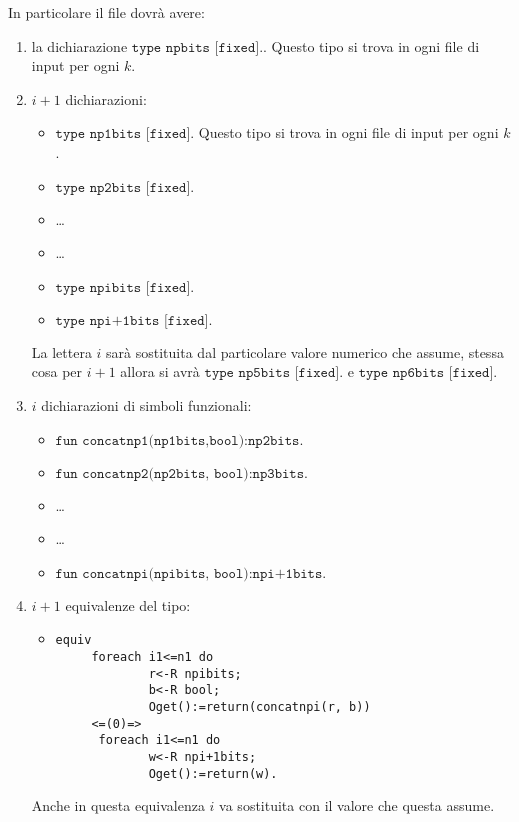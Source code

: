 \documentclass[a4paper,openright,twoside,12pt]{report}
\begin{document}
In particolare il file dovr\`a avere:
\begin{enumerate}
 \item la dichiarazione $\texttt{type npbits [fixed].}$. Questo tipo si trova in ogni file di input per ogni $k$.
 \item $i+1$ dichiarazioni: \begin{itemize}
                                       \item $\texttt{type np1bits [fixed].}$ Questo tipo si trova in ogni file di input per ogni $k$.
                                       \item $\texttt{type np2bits [fixed].}$
				       \item \dots
				       \item \dots
				       \item $\texttt{type npibits [fixed].}$
				       \item $\texttt{type npi+1bits [fixed].}$	
	                               \end{itemize}
La lettera $i$ sar\`a sostituita dal particolare valore numerico che assume, stessa cosa per $i+1$
allora si avr\`a $\texttt{type np5bits [fixed].}$ e $\texttt{type np6bits [fixed].}$
       
  \item $i$ dichiarazioni di simboli funzionali:\begin{itemize}
                                                          \item $\texttt{fun concatnp1(np1bits,bool):np2bits.}$
							  \item $\texttt{fun concatnp2(np2bits, bool):np3bits.}$
							  \item \dots
							  \item \dots
							  \item $\texttt{fun concatnpi(npibits, bool):npi+1bits.}$    
                                                         \end{itemize}
 
  \item  $i+1$ equivalenze del tipo:
				\begin{itemize}
				 \item \begin{verbatim}
equiv
     foreach i1<=n1 do
             r<-R npibits;
             b<-R bool;
             Oget():=return(concatnpi(r, b))
     <=(0)=>
      foreach i1<=n1 do
             w<-R npi+1bits;
             Oget():=return(w).
				\end{verbatim}
\end{itemize}
Anche in questa equivalenza $i$ va sostituita con il valore che questa assume.


\end{enumerate}
\end{document}

